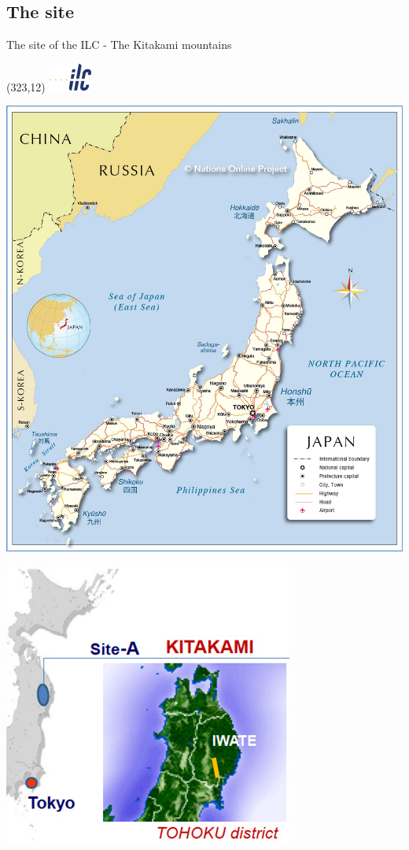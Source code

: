 \documentclass[xcolor={dvipsnames}]{beamer}
\newcommand{\ilclogo}{
  \setlength{\TPHorizModule}{1pt}
  \setlength{\TPVertModule}{1pt}
  \begin{textblock}{1}(323,12)
   \includegraphics[width=40pt,height=26pt]{figures/ILC.jpeg}
  \end{textblock}
}
\begin{document}
\subsection{The site}
\begin{frame}{The site of the ILC - The Kitakami mountains}
\ilclogo
\begin{center}
\begin{minipage}[t]{0.49\textwidth}
\centering
 \includegraphics[width=\textwidth]{figures/japan-map.jpg}
\end{minipage}
\begin{minipage}[t]{0.48\textwidth}
\centering
   \includegraphics[width=\textwidth]{figures/Kitakami_site.jpg}

\end{minipage}
\end{center}
\end{frame}
\end{document}
